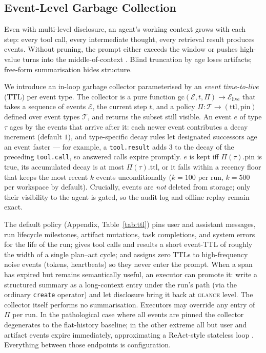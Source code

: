 \subsection{Event-Level Garbage Collection}
\label{sec:component_gc}

Even with multi-level disclosure, an agent's working context grows with
each step: every tool call, every intermediate thought, every retrieval
result produces events. Without pruning, the prompt either exceeds the
window or pushes high-value turns into the middle-of-context
\citep{liu2024lostmiddle}. Blind truncation by age loses artifacts;
free-form summarisation hides structure.

We introduce an in-loop garbage collector parameterised by an
\emph{event time-to-live} (TTL) per event type. The collector is a pure
function $\mathrm{gc}(\mathcal{E}, t, \Pi) \to \mathcal{E}_{\text{live}}$
that takes a sequence of events $\mathcal{E}$, the current step $t$, and
a policy $\Pi: \mathcal{T} \to (\text{ttl}, \text{pin})$
defined over event types $\mathcal{T}$, and returns the subset still
visible. An event $e$ of type $\tau$ ages by the events that arrive
after it: each newer event contributes a decay increment (default
$1$), and type-specific decay rules let designated successors age an
event faster --- for example, a \texttt{tool.result} adds $3$ to the
decay of the preceding \texttt{tool.call}, so answered calls expire
promptly. $e$ is kept iff $\Pi(\tau).\text{pin}$ is true, its
accumulated decay is at most $\Pi(\tau).\text{ttl}$, or it falls
within a recency floor that keeps the most recent $k$ events
unconditionally ($k{=}100$ per run, $k{=}500$ per workspace by
default).
Crucially, events are \emph{not} deleted from storage; only their
visibility to the agent is gated, so the audit log and offline replay
remain exact.

The default policy (Appendix, Table~\ref{tab:ttl}) pins user and
assistant messages, run lifecycle milestones, artifact mutations, task
completions, and system errors for the life of the run;
gives tool calls and results a short event-TTL of roughly the width of
a single plan--act cycle; and assigns zero TTLs to high-frequency
noise events (tokens, heartbeats) so they never enter the prompt. When
a span has expired but remains semantically useful, an executor can
promote it: write a structured summary as a long-context entry under
the run's path (via the ordinary \texttt{create} operator) and let
disclosure bring it back at \textsc{glance} level. The collector
itself performs no summarisation.
Executors may override any entry of $\Pi$ per run. In the
pathological case where all events are pinned the collector degenerates
to the flat-history baseline; in the other extreme all but user and
artifact events expire immediately, approximating a ReAct-style
stateless loop \citep{yao2023react}. Everything between those endpoints
is configuration.

